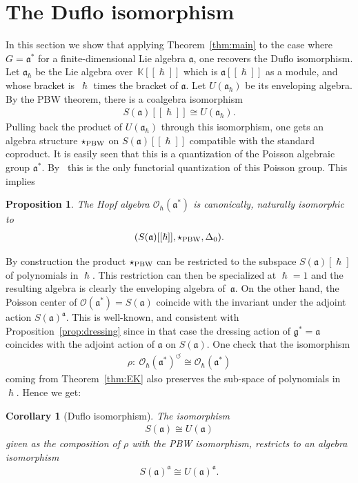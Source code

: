 \documentclass[10pt,a4paper]{amsart}
\numberwithin{equation}{section}
\newcommand{\ca}{\circlearrowleft}
\newcommand{\mf}[1]{\mathfrak{#1}}
\newcommand{\h}{\hslash}
\newcommand{\cO}{\mathcal O}
\newcommand{\kk}{\mathbb K}
\newtheorem{cor}[thm]{Corollary}
\newtheorem{prop}[thm]{Proposition}
\theoremstyle{definition}
\begin{document}
\section{The Duf\/lo isomorphism}
In this section we show that applying Theorem~\ref{thm:main} to the case where $G=\mf a^*$ for a f\/inite-dimensional Lie algebra $\mf a$, one recovers the Duf\/lo isomorphism. Let $\mf a_\h$ be the Lie algebra over~$\kk[[\h]]$ which is $\mf a[[\h]]$ as a module, and whose bracket is~$\h$ times the bracket of $\mf a$. Let $U(\mf a_\h)$ be its enveloping algebra. By the PBW theorem, there is a coalgebra isomorphism
\begin{gather*}
	S(\mf a)[[\h]]\cong U(\mf a_\h).
\end{gather*}
Pulling back the product of $U(\mf a_\h)$ through this isomorphism, one gets an algebra structure $\star_{\rm PBW}$ on $S(\mf a)[[\h]]$ compatible with the standard coproduct. It is easily seen that this is a quantization of the Poisson algebraic group $\mf a^*$. By~\cite[Lemma~3.2]{Enriquez2010a} this is the only functorial quantization of this Poisson group. This implies
\begin{prop}
	The Hopf algebra $\cO_\h(\mf a^*)$ is canonically, naturally isomorphic to
\begin{gather*}
(S(\mf a)[[\h]],\star_{\rm PBW},\Delta_0).
\end{gather*}
\end{prop}

By construction the product $\star_{\rm PBW}$ can be restricted to the subspace $S(\mf a)[\h]$ of polynomials in $\h$. This restriction can then be specialized at $\h=1$ and the resulting algebra is clearly the enveloping algebra of~$\mf a$. On the other hand, the Poisson center of $\cO(\mf a^*)=S(\mf a)$ coincide with the invariant under the adjoint action $S(\mf a)^{\mf a}$. This is well-known, and consistent with Proposition~\ref{prop:dressing} since in that case the dressing action of $\mf g^*=\mf a$ coincides with the adjoint action of $\mf a$ on $S(\mf a)$. One check that the isomorphism
\begin{gather*}
	\rho\colon \ \cO_\h(\mf a^*)^\ca\cong \cO_\h(\mf a^*)
\end{gather*}
coming from Theorem~\ref{thm:EK} also preserves the sub-space of polynomials in $\h$. Hence we get:
\begin{cor}[Duf\/lo isomorphism]
The isomorphism
\begin{gather*}
	S(\mf a)\cong U(\mf a)
\end{gather*}
given as the composition of $\rho$ with the PBW isomorphism, restricts to an algebra isomorphism
\begin{gather*}
	S(\mf a)^{\mf a}\cong U(\mf a)^{\mf a}.
\end{gather*}
\end{cor}
\end{document}

